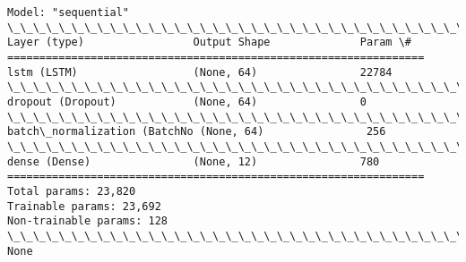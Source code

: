\documentclass[11pt]{article}
\begin{document}
    \begin{Verbatim}[commandchars=\\\{\}]
Model: "sequential"
\_\_\_\_\_\_\_\_\_\_\_\_\_\_\_\_\_\_\_\_\_\_\_\_\_\_\_\_\_\_\_\_\_\_\_\_\_\_\_\_\_\_\_\_\_\_\_\_\_\_\_\_\_\_\_\_\_\_\_\_\_\_\_\_\_
Layer (type)                 Output Shape              Param \#
=================================================================
lstm (LSTM)                  (None, 64)                22784
\_\_\_\_\_\_\_\_\_\_\_\_\_\_\_\_\_\_\_\_\_\_\_\_\_\_\_\_\_\_\_\_\_\_\_\_\_\_\_\_\_\_\_\_\_\_\_\_\_\_\_\_\_\_\_\_\_\_\_\_\_\_\_\_\_
dropout (Dropout)            (None, 64)                0
\_\_\_\_\_\_\_\_\_\_\_\_\_\_\_\_\_\_\_\_\_\_\_\_\_\_\_\_\_\_\_\_\_\_\_\_\_\_\_\_\_\_\_\_\_\_\_\_\_\_\_\_\_\_\_\_\_\_\_\_\_\_\_\_\_
batch\_normalization (BatchNo (None, 64)                256
\_\_\_\_\_\_\_\_\_\_\_\_\_\_\_\_\_\_\_\_\_\_\_\_\_\_\_\_\_\_\_\_\_\_\_\_\_\_\_\_\_\_\_\_\_\_\_\_\_\_\_\_\_\_\_\_\_\_\_\_\_\_\_\_\_
dense (Dense)                (None, 12)                780
=================================================================
Total params: 23,820
Trainable params: 23,692
Non-trainable params: 128
\_\_\_\_\_\_\_\_\_\_\_\_\_\_\_\_\_\_\_\_\_\_\_\_\_\_\_\_\_\_\_\_\_\_\_\_\_\_\_\_\_\_\_\_\_\_\_\_\_\_\_\_\_\_\_\_\_\_\_\_\_\_\_\_\_
None
    \end{Verbatim}
\end{document}
